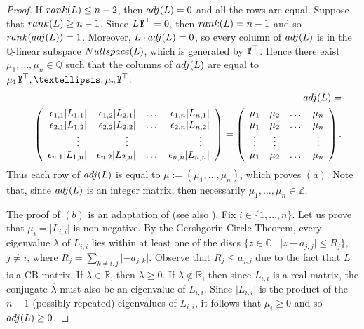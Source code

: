 \documentclass[10pt]{amsart}
\newcommand{\mbz}{\mbox{$\mathbb{Z}$}}
\newcommand{\mbq}{\mbox{$\mathbb{Q}$}}
\newcommand{\mbr}{\mbox{$\mathbb{R}$}}
\newcommand{\mbc}{\mbox{$\mathbb{C}$}}
\newcommand{\mbone}{\mbox{$1\mkern-4.6mu {\rm l}$}}
\newcommand{\cb}{\mbox{$\mathrm{CB}$}}
\newcommand{\rank}{\mbox{${\rm rank}$}}
\newcommand{\nulls}{\mbox{${\rm Nullspace}$}}
\newcommand{\adj}{\mbox{${\rm adj}$}}
\theoremstyle{definition}
\theoremstyle{remark}
\begin{document}
\begin{proof}
If $\rank(L)\leq n-2$, then $\adj(L)=0$ and all the rows are
equal. Suppose that $\rank(L)\geq n-1$. Since $L\mbone^{\top}=0$, then
$\rank(L)=n-1$ and so $\rank(\adj(L))=1$. Moreover, $L\cdot\adj(L)=0$,
so every column of $\adj(L)$ is in the $\mbq$-linear subspace
$\nulls(L)$, which is generated by $\mbone^{\top}$. Hence there exist
$\mu_1,\ldots ,\mu_n\in\mbq$ such that the columns of $\adj(L)$ are
equal to $\mu_1\mbone^{\top}, \ldots,\mu_n\mbone^{\top}$:
\begin{eqnarray}\label{adjugate}
&&\adj(L)= \\ && \left(\begin{array}{rrrr} \epsilon_{1,1}\lvert
L_{1,1}\rvert&\epsilon_{1,2}\lvert L_{2,1}\rvert&\ldots&
\epsilon_{1,n}\lvert L_{n,1}\rvert\\ \epsilon_{2,1}\lvert
L_{1,2}\rvert&\epsilon_{2,2}\lvert L_{2,2}\rvert&\ldots&
\epsilon_{2,n}\lvert L_{n,2}\rvert\\ 
\vdots\phantom{+}&\vdots\phantom{+}&&\vdots\phantom{+}
\\ \epsilon_{n,1}\lvert L_{1,n}\rvert&\epsilon_{n,2}\lvert 
L_{2,n}\rvert&\ldots& \epsilon_{n,n}\lvert L_{n,n}\rvert
\end{array}\right)= 
\left(\begin{array}{cccc}
\mu_1&\mu_2&\ldots&\mu_n\\
\mu_1&\mu_2&\ldots&\mu_n\\
\vdots&\vdots&&\vdots\\
\mu_1&\mu_2&\ldots&\mu_n
\end{array}\right). \notag
\end{eqnarray}
Thus each row of $\adj(L)$ is equal to $\mu:=(\mu_1,\ldots ,\mu_n)$,
which proves $(a)$. Note that, since $\adj(L)$ is an integer matrix,
then necessarily $\mu_1,\ldots ,\mu_n\in\mbz$.

The proof of $(b)$ is an adaptation of \cite[Lemma~2.1]{op} (see also
\cite[Theorem~6.3,~$(c)$]{opv}). Fix $i\in\{1,\ldots ,n\}$. Let us
prove that $\mu_{i}=\lvert L_{i,i}\rvert$ is non-negative.  By the
Gershgorin Circle Theorem, every eigenvalue $\lambda$ of $L_{i,i}$
lies within at least one of the discs $\{z\in\mbc\mid \lvert
z-a_{j,j}\rvert\leq R_{j}\}$, $j\neq i$, where $R_{j}=\sum_{k\neq
  i,j}\lvert -a_{j,k}\rvert$. Observe that $R_{j}\leq a_{j,j}$ due to
the fact that $L$ is a $\cb$ matrix. If $\lambda\in\mbr$, then
$\lambda\geq 0$. If $\lambda\not\in \mbr$, then since $L_{i,i}$ is a
real matrix, the conjugate $\overline{\lambda}$ must also be an
eigenvalue of $L_{i,i}$. Since $\lvert L_{i,i}\rvert$ is the product
of the $n-1$ (possibly repeated) eigenvalues of $L_{i,i}$, it follows
that $\mu_i\geq 0$ and so $\adj(L)\geq 0$.


\end{proof}
\end{document}
